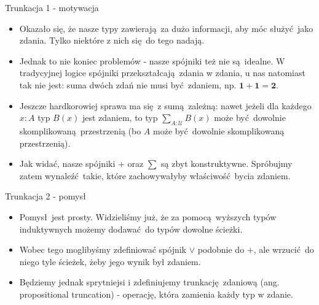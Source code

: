 \documentclass{beamer}
\newcommand{\U}{\mathcal{U}}
\begin{document}
\begin{frame}{Trunkacja 1 - motywacja}
\begin{itemize}
	\item Okazało się, że nasze typy zawierają za dużo informacji, aby móc służyć jako zdania. Tylko niektóre z nich się do tego nadają.
	\item Jednak to nie koniec problemów - nasze spójniki też nie są idealne. W tradycyjnej logice spójniki przekształcają zdania w zdania, u nas natomiast tak nie jest: suma dwóch zdań nie musi być zdaniem, np. $\mathbf{1} + \mathbf{1} = \mathbf{2}$.
	\item Jeszcze hardkorowiej sprawa ma się z sumą zależną: nawet jeżeli dla każdego $x : A$ typ $B(x)$ jest zdaniem, to typ $\sum_{A : \U} B(x)$ może być dowolnie skomplikowaną przestrzenią (bo $A$ może być dowolnie skomplikowaną przestrzenią).
	\item Jak widać, nasze spójniki $+$ oraz $\sum$ są zbyt konstruktywne. Spróbujmy zatem wynaleźć takie, które zachowywałyby właściwość bycia zdaniem.
\end{itemize}
\end{frame}

\begin{frame}{Trunkacja 2 - pomysł}
\begin{itemize}
	\item Pomysł jest prosty. Widzieliśmy już, że za pomocą wyższych typów induktywnych możemy dodawać do typów dowolne ścieżki.
	\item Wobec tego moglibyśmy zdefiniować spójnik $\lor$ podobnie do $+$, ale wrzucić do niego tyle ścieżek, żeby jego wynik był zdaniem.
	\item Będziemy jednak sprytniejsi i zdefiniujemy trunkację zdaniową (ang. propositional truncation) - operację, która zamienia każdy typ w zdanie.
\end{itemize}
\end{frame}
\end{document}
